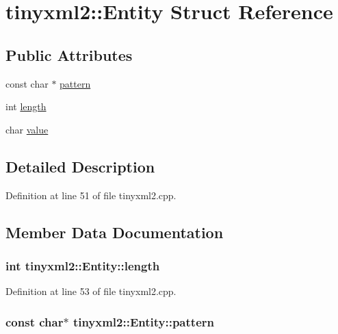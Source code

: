 \hypertarget{structtinyxml2_1_1_entity}{\section{tinyxml2\+:\+:Entity Struct Reference}
\label{structtinyxml2_1_1_entity}
}
\subsection*{Public Attributes}
\begin{DoxyCompactItemize}
\item 
const char $\ast$ \hyperlink{structtinyxml2_1_1_entity_ab330f5d665d29bfc811ecfa76315894b}{pattern}
\item 
int \hyperlink{structtinyxml2_1_1_entity_a25e2b57cb59cb4fa68f283d7cb570f21}{length}
\item 
char \hyperlink{structtinyxml2_1_1_entity_a7334e81e33b4615655a403711b24f3ed}{value}
\end{DoxyCompactItemize}


\subsection{Detailed Description}


Definition at line 51 of file tinyxml2.\+cpp.



\subsection{Member Data Documentation}
\hypertarget{structtinyxml2_1_1_entity_a25e2b57cb59cb4fa68f283d7cb570f21}{
\subsubsection[{length}]{\setlength{\rightskip}{0pt plus 5cm}int tinyxml2\+::\+Entity\+::length}}\label{structtinyxml2_1_1_entity_a25e2b57cb59cb4fa68f283d7cb570f21}


Definition at line 53 of file tinyxml2.\+cpp.

\hypertarget{structtinyxml2_1_1_entity_ab330f5d665d29bfc811ecfa76315894b}{
\subsubsection[{pattern}]{\setlength{\rightskip}{0pt plus 5cm}const char$\ast$ tinyxml2\+::\+Entity\+::pattern}}\label{structtinyxml2_1_1_entity_ab330f5d665d29bfc811ecfa76315894b}


